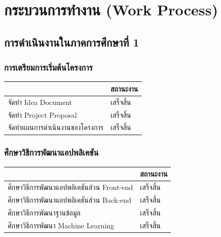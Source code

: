 \documentclass[14pt,oneside,openright,a4paper]{cpe-thai-project}
\begin{document}
\section{กระบวนการทำงาน (Work Process)}
\subsection{การดำเนินงานในภาคการศึกษาที่ 1}
  \subsubsection{การเตรียมการเริ่มต้นโครงการ}
    \begin{table}[!h]\centering
      \begin{tabular}{|l|l|}
      \hline
      \rowcolor[HTML]{9FC5E8} 
      \multicolumn{1}{|c|}{\cellcolor[HTML]{9FC5E8}ภาระงาน} & \multicolumn{1}{c|}{\cellcolor[HTML]{9FC5E8}สถานะงาน} \\ \hline
      จัดทำ Idea Document                                 & \cellcolor[HTML]{34FF34}เสร็จสิ้น                        \\ \hline
      จัดทำ Project Proposal                              & \cellcolor[HTML]{34FF34}เสร็จสิ้น                        \\ \hline
      จัดทำแผนการดำเนินงานของโครงการ                      & \cellcolor[HTML]{34FF34}เสร็จสิ้น                        \\ \hline
      \end{tabular}
      \end{table}

  \subsubsection{ศึกษาวิธีการพัฒนาแอปพลิเคชัน}
    \begin{table}[!h]\centering
      \begin{tabular}{|l|l|}
      \hline
      \rowcolor[HTML]{9FC5E8} 
      \multicolumn{1}{|c|}{\cellcolor[HTML]{9FC5E8}ภาระงาน} & \multicolumn{1}{c|}{\cellcolor[HTML]{9FC5E8}สถานะงาน} \\ \hline
      ศึกษาวิธีการพัฒนาแอปพลิเคชันส่วน Front-end          & \cellcolor[HTML]{34FF34}เสร็จสิ้น                        \\ \hline
      ศึกษาวิธีการพัฒนาแอปพลิเคชันส่วน Back-end              & \cellcolor[HTML]{34FF34}เสร็จสิ้น                        \\ \hline
      ศึกษาวิธีการพัฒนาฐานข้อมูล                          & \cellcolor[HTML]{34FF34}เสร็จสิ้น                        \\ \hline
      ศึกษาวิธีการพัฒนา Machine Learning                  & \cellcolor[HTML]{34FF34}เสร็จสิ้น                        \\ \hline
      \end{tabular}
      \end{table}
\end{document}
